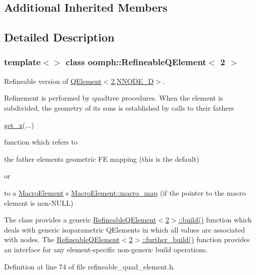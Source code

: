 \subsection*{Additional Inherited Members}


\subsection{Detailed Description}
\subsubsection*{template$<$$>$\newline
class oomph\+::\+Refineable\+Q\+Element$<$ 2 $>$}

Refineable version of \hyperlink{classoomph_1_1QElement_3_012_00_01NNODE__1D_01_4}{Q\+Element$<$2,\+N\+N\+O\+D\+E\+\_\+D$>$}.

Refinement is performed by quadtree procedures. When the element is subdivided, the geometry of its sons is established by calls to their father\textquotesingle{}s 
\begin{DoxyCode}
\hyperlink{classoomph_1_1FiniteElement_a6fc14cbf4e1d031acbc59b415cefa1ca}{get\_x}(...) 
\end{DoxyCode}
 function which refers to
\begin{DoxyItemize}
\item the father element\textquotesingle{}s geometric FE mapping (this is the default)
\end{DoxyItemize}or
\begin{DoxyItemize}
\item to a \hyperlink{classoomph_1_1MacroElement}{Macro\+Element} \textquotesingle{}s \hyperlink{classoomph_1_1MacroElement_a85e7842ad949bb4062a9ff302fa452e5}{Macro\+Element\+::macro\+\_\+map} (if the pointer to the macro element is non-\/\+N\+U\+LL)
\end{DoxyItemize}

The class provides a generic \hyperlink{classoomph_1_1RefineableQElement_3_012_01_4_a8be1a217931d1054ab626ebd1adae182}{Refineable\+Q\+Element$<$2$>$\+::build()} function which deals with generic isoparametric Q\+Elements in which all values are associated with nodes. The \hyperlink{classoomph_1_1RefineableElement_a26628ce36dfad028686adeb4694a9ef3}{Refineable\+Q\+Element$<$2$>$\+::further\+\_\+build()} function provides an interface for any element-\/specific non-\/generic build operations. 

Definition at line 74 of file refineable\+\_\+quad\+\_\+element.\+h.



